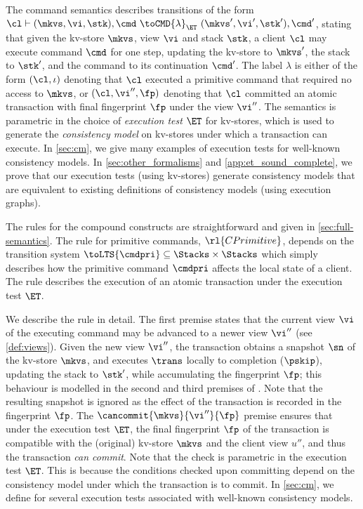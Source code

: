 %
The command semantics describes transitions of the form
$\cl \vdash (\mkvs, \vi, \stk), \cmd \ \toCMD{\lambda}_{\ET} \ (\mkvs', \vi', \stk') ,
\cmd'$, stating that given the kv-store $\mkvs$, view $\vi$ and stack $\stk$, 
a client $\cl$ may execute command $\cmd$ for one step, updating 
the kv-store to $\mkvs'$, the stack to $\stk'$, and the command to its continuation $\cmd'$.
The label $\lambda$ is either of the form $(\cl, \iota)$ denoting that $\cl$ executed a primitive command
that required no access to $\mkvs$, 
or $(\cl, \vi'', \fp)$ denoting that $\cl$ committed an atomic transaction with final fingerprint $\fp$ under the view $\vi''$.
The semantics is parametric in the choice of \emph{execution test}
$\ET$ for kv-stores, which is used to generate 
the \emph{consistency model} on kv-stores
under which a 
transaction can execute.
In \cref{sec:cm}, we give many examples of execution tests for
well-known consistency models.
In \cref{sec:other_formalisms} and \cref{app:et_sound_complete}, we prove that our execution tests (using kv-stores) generate consistency models that are equivalent to existing definitions of
consistency models (using execution graphs). 

The rules for the compound constructs are straightforward and given in \cref{sec:full-semantics}.
The rule for primitive commands, $\rl{CPrimitive}$, 
depends on the 
transition system $\toLTS{\cmdpri} \subseteq \Stacks \times \Stacks$ 
which simply describes how the primitive command $\cmdpri$ affects the local state of a client.
The rule   describes the execution of an atomic 
transaction under the execution test $\ET$. 


We describe the  rule in detail. 
The first premise 
states that the current view $\vi$ of the executing command may be advanced to a newer  view $\vi''$ (see \cref{def:views}). 
Given the new view $\vi''$, the transaction obtains a snapshot $\sn$ of the kv-store $\mkvs$, 
and executes $\trans$ locally to completion ($\pskip$), updating the stack to $\stk'$, while accumulating the fingerprint $\fp$; 
this behaviour  is modelled in the second and third premises of .
Note that the resulting snapshot is ignored 
as the effect of the transaction is recorded in the fingerprint $\fp$. 
The $\cancommit{\mkvs}{\vi''}{\fp}$ premise ensures that under the execution test $\ET$, 
the final fingerprint $\fp$ of the transaction is compatible with the (original) kv-store
$\mkvs$ and the client view $u''$, and thus the transaction \emph{can commit}. 
Note that the \cancommitname check is parametric in the execution test $\ET$.
This is because the conditions checked upon committing depend on the consistency model under which the transaction is to commit. 
In \cref{sec:cm}, we define \cancommitname for several execution tests associated with well-known consistency models.


